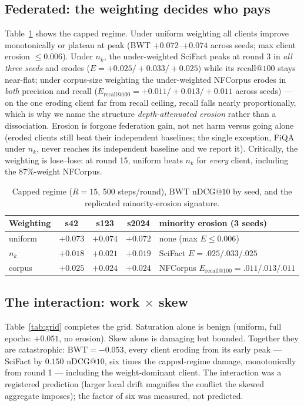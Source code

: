 \documentclass[sigconf,anonymous,review]{acmart}
\makeatletter
\newcommand{\ndcg}{\mathrm{nDCG@10}}
\newcommand{\rc}[1]{\mathrm{recall@#1}}
\newcommand{\BWT}{\mathrm{BWT}}
\makeatother
\begin{document}
\subsection{Federated: the weighting decides who pays}
Table~\ref{tab:capped} shows the capped regime. Under uniform weighting all clients improve monotonically or plateau at peak (BWT $+0.072$--$+0.074$ across seeds; max client erosion $\le 0.006$). Under $n_k$, the under-weighted SciFact peaks at round 3 in \emph{all three seeds} and erodes ($E = +0.025/+0.033/+0.025$) while its $\rc{100}$ stays near-flat; under corpus-size weighting the under-weighted NFCorpus erodes in \emph{both} precision and recall ($E_{\rc{100}} = +0.011/+0.013/+0.011$ across seeds) --- on the one eroding client far from recall ceiling, recall falls nearly proportionally, which is why we name the structure \emph{depth-attenuated erosion} rather than a dissociation. Erosion is forgone federation gain, not net harm versus going alone (eroded clients still beat their independent baselines; the single exception, FiQA under $n_k$, never reaches its independent baseline and we report it). Critically, the weighting is lose--lose: at round 15, uniform beats $n_k$ for \emph{every} client, including the 87\%-weight NFCorpus.

\begin{table}[t]
\caption{Capped regime ($R{=}15$, 500 steps/round), $\BWT$ $\ndcg$ by seed, and the replicated minority-erosion signature.}
\label{tab:capped}
\begin{tabular}{lccc l}
\toprule
Weighting & s42 & s123 & s2024 & minority erosion (3 seeds)\\
\midrule
uniform & $+0.073$ & $+0.074$ & $+0.072$ & none (max $E{\le}0.006$)\\
$n_k$ & $+0.018$ & $+0.021$ & $+0.019$ & SciFact $E{=}.025/.033/.025$\\
corpus & $+0.025$ & $+0.024$ & $+0.024$ & NFCorpus $E_{\rc{100}}{=}.011/.013/.011$\\
\bottomrule
\end{tabular}
\end{table}

\subsection{The interaction: work $\times$ skew}
Table~\ref{tab:grid} completes the grid. Saturation alone is benign (uniform, full epochs: $+0.051$, no erosion). Skew alone is damaging but bounded. Together they are catastrophic: $\BWT=-0.053$, every client eroding from its early peak --- SciFact by $0.150$ $\ndcg$, six times the capped-regime damage, monotonically from round 1 --- including the weight-dominant client. The interaction was a registered prediction (larger local drift magnifies the conflict the skewed aggregate imposes); the factor of six was measured, not predicted.
\end{document}
